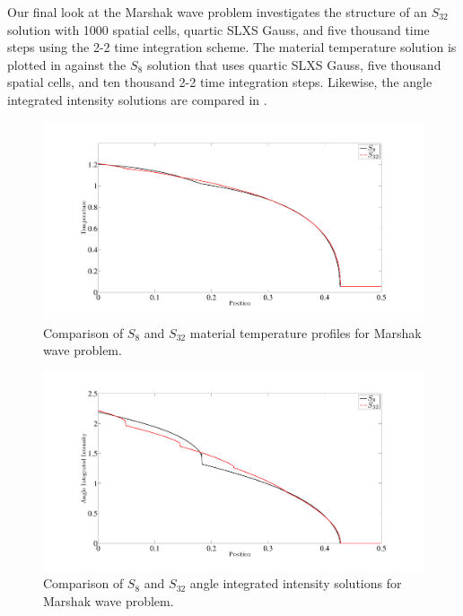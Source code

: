 Our final look at the Marshak wave problem investigates the structure of an $S_{32}$ solution with 1000 spatial cells, quartic SLXS Gauss, and five thousand time steps using the 2-2 time integration scheme.
The material temperature solution is plotted in  against the $S_8$ solution that uses quartic SLXS Gauss,  five thousand spatial cells, and ten thousand 2-2 time integration steps.
Likewise, the angle integrated intensity solutions are compared in .
\begin{figure}[!htp]
\centering
\includegraphics[width=16cm,trim=1.5in  0.2in 0.5in 0.75in,clip=true]{chapter6_grey_radtran/Dissertation_Data/S8_vs_S32_Material_Temperature.pdf}
\caption{Comparison of $S_8$ and $S_{32}$ material temperature profiles for Marshak wave problem.}
\label{fig:s8_vs_s32_temperature}
\end{figure}
%
%
\begin{figure}[!htp]
\centering
\includegraphics[width=16cm,trim=1.5in  0.2in 0.5in 0.75in,clip=true]{chapter6_grey_radtran/Dissertation_Data/S8_vs_S32_Radiation.pdf}
\caption{Comparison of $S_8$ and $S_{32}$ angle integrated intensity solutions for Marshak wave problem.}
\label{fig:s8_vs_s32_radiation}
\end{figure}
